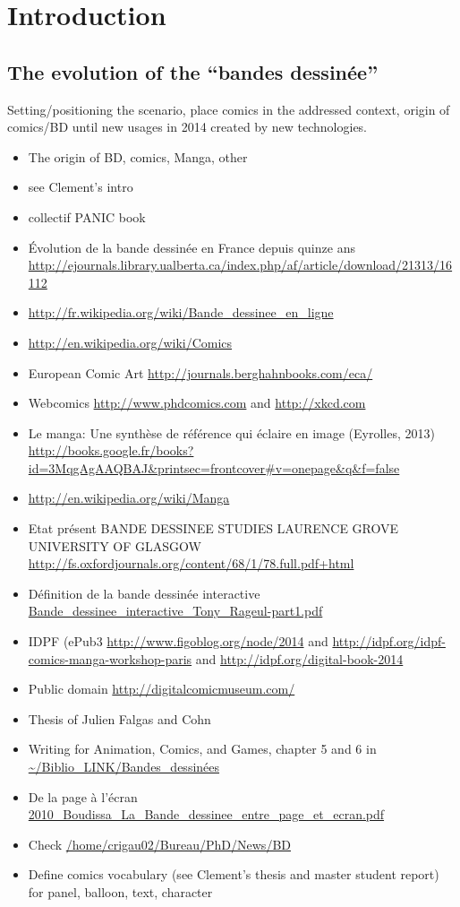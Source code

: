 \chapter{Introduction}%
\label{chap:intro}
\graphicspath{{./chapters/1-introduction/figs/}}
\section{The evolution of the ``bandes dessinée''}
Setting/positioning the scenario, place comics in the addressed context, origin of comics/BD until new usages in 2014 created by new technologies.
\cite[p.~215]{McCloud94}

\begin{itemize}
	\item The origin of BD, comics, Manga, other

	\item see Clement's intro
	\item collectif PANIC book
	\item Évolution de la bande dessinée en France depuis quinze ans \url{http://ejournals.library.ualberta.ca/index.php/af/article/download/21313/16112}
	\item \url{http://fr.wikipedia.org/wiki/Bande_dessinee_en_ligne}

	\item \url{http://en.wikipedia.org/wiki/Comics}
	\item European Comic Art \url{http://journals.berghahnbooks.com/eca/}
	\item Webcomics \url{http://www.phdcomics.com} and \url{http://xkcd.com}
	\item Le manga: Une synthèse de référence qui éclaire en image (Eyrolles, 2013) \url{http://books.google.fr/books?id=3MqgAgAAQBAJ&printsec=frontcover#v=onepage&q&f=false}
	\item \url{http://en.wikipedia.org/wiki/Manga}
	\item Etat présent BANDE DESSINEE STUDIES LAURENCE GROVE UNIVERSITY OF GLASGOW \url{http://fs.oxfordjournals.org/content/68/1/78.full.pdf+html}
	\item Définition de la bande dessinée interactive \url{Bande_dessinee_interactive_Tony_Rageul-part1.pdf}
	\item IDPF (ePub3 \url{http://www.figoblog.org/node/2014} and \url{http://idpf.org/idpf-comics-manga-workshop-paris} and \url{http://idpf.org/digital-book-2014}
	\item Public domain \url{http://digitalcomicmuseum.com/}
	\item Thesis of Julien Falgas and Cohn
	\item Writing for Animation, Comics, and Games, chapter 5 and 6 in \url{~/Biblio_LINK/Bandes_dessinées}
	\item De la page à l'écran \url{2010_Boudissa_La_Bande_dessinee_entre_page_et_ecran.pdf}
	\item Check \url{/home/crigau02/Bureau/PhD/News/BD}
	\item Define comics vocabulary (see Clement's thesis and master student report) for panel, balloon, text, character
	
\end{itemize}


